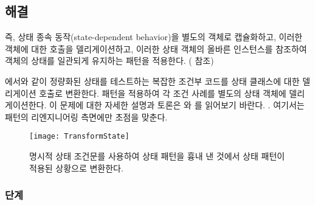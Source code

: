 \documentclass[a4paper,10pt,twoside]{book}
\begin{document}
\subsection*{해결}

즉, 상태 종속 동작(state-dependent behavior)을 별도의 객체로 캡슐화하고, 이러한 객체에 대한 호출을 델리게이션하고, 이러한 상태 객체의 올바른 인스턴스를 참조하여 객체의 상태를 일관되게 유지하는  패턴을 적용한다. ( 참조)

에서와 같이 정량화된 상태를 테스트하는 복잡한 조건부 코드를 상태 클래스에 대한 델리게이션 호출로 변환한다.  패턴을 적용하여 각 조건 사례를 별도의 상태 객체에 델리게이션한다. 이 문제에 대한 자세한 설명과 토론은 와 를 읽어보기 바란다. \cite{Alpe98a} \cite{Dyso97a}. 여기서는 패턴의 리엔지니어링 측면에만 초점을 맞춘다.

\begin{figure}
\begin{center}
\texttt{[image: TransformState]}
\caption{명시적 상태 조건문를 사용하여 상태 패턴을 흉내 낸 것에서 상태 패턴이 적용된 상황으로 변환한다.}
\end{center}
\end{figure}

\subsubsection*{단계}
\end{document}
